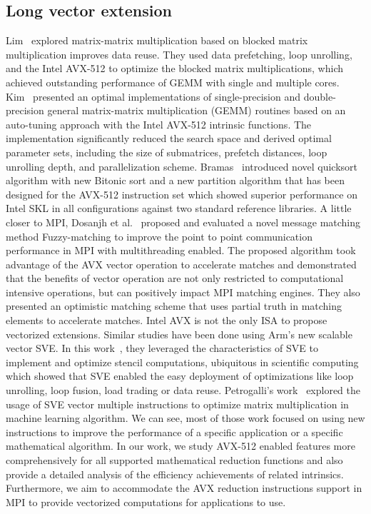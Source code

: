 \documentclass[sigconf]{acmart}
\newcommand{\sve}[0]{\textsc{SVE}\xspace}
\begin{document}
\subsection{Long vector extension}
Lim~\cite{Lim2018} explored matrix-matrix multiplication based on blocked matrix multiplication
improves data reuse. They used data prefetching, loop unrolling, and the Intel AVX-512
to optimize the blocked matrix multiplications, which achieved outstanding performance of GEMM
with single and multiple cores.
%
Kim~\cite{Kim19} presented an optimal implementations of single-precision and double-precision general matrix-matrix multiplication (GEMM) routines based on an auto-tuning approach with the Intel AVX-512 intrinsic functions.
The implementation significantly reduced the search space and derived optimal parameter sets, including the size of submatrices, prefetch distances, loop unrolling depth, and parallelization scheme.
%
Bramas~\cite{Bramas_2017} introduced novel quicksort algorithm with new Bitonic sort and a new
partition algorithm that has been designed for the AVX-512
instruction set which showed superior performance on Intel SKL in
all configurations against two standard reference libraries.
%
A little closer to MPI, Dosanjh et al.~\cite{tag-match} proposed and evaluated a novel message matching method Fuzzy-matching
to improve the point to point communication performance in MPI with multithreading enabled.
The proposed algorithm took advantage of the AVX vector operation to accelerate matches
and demonstrated that the benefits of vector operation are not only restricted to computational intensive operations, but can positively impact MPI matching engines. They also presented an optimistic
matching scheme that uses partial truth in matching elements
to accelerate matches.
%
Intel AVX is not the only ISA to propose vectorized extensions. Similar studies have been done using Arm's new scalable vector SVE.
In this work~\cite{sve-stencil}, they leveraged the characteristics of \sve to implement and optimize
stencil computations, ubiquitous in scientific computing which showed
that \sve enabled the easy deployment of optimizations like loop unrolling,
loop fusion, load trading or data reuse.
%
Petrogalli's work~\cite{sve_ml} explored the usage of SVE vector multiple
instructions to optimize matrix multiplication in machine learning algorithm.
%
We can see, most of those work focused on using new instructions
to improve the performance of a specific application or a specific mathematical algorithm.
In our work, we study AVX-512 enabled features more comprehensively for
all supported mathematical reduction functions and also provide
a detailed analysis of the efficiency achievements of related intrinsics.
Furthermore, we aim to accommodate the AVX reduction instructions support in MPI to provide
vectorized computations for applications to use.
\end{document}
